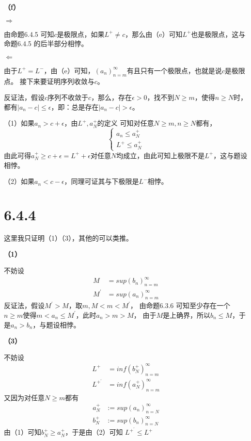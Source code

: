\documentclass{article}
\theoremstyle{mystyle}
\begin{document}
\textbf{（f）}

\textbf{$\Rightarrow$}

由命题6.4.5 可知$c$是极限点，如果$L^+ \neq c$，那么由（e）可知$L^+$也是极限点，这与命题6.4.5
的后半部分相悖。

\textbf{$\Leftarrow$}

由于$L^+ = L^-$，由（e）可知，$(a_n)_{n=m}^\infty$有且只有一个极限点，也就是说$c$是极限点。
接下来要证明序列收敛与$c$。

反证法，假设$c$序列不收敛于$c$，那么，存在$\epsilon > 0$，找不到$N \geq m$，使得$n \geq N$时，
都有$|a_n -c| \leq \epsilon$，即：总是存在$|a_n -c| > \epsilon$。

（1）如果$a_n > c+\epsilon$，由$L^+,a_N^+$的定义 可知对任意$N \geq m, n \geq N$都有，
\begin{equation}
  \begin{cases*}
    a_n \leq a_N^+ \\
    L^+ \leq a_N^+
  \end{cases*}
\end{equation}
由此可得$a_N^+ \geq c+\epsilon=L^+ + \epsilon$对任意$N$均成立，由此可知上极限不是$L^+$，这与题设相悖。

（2）如果$a_n < c - \epsilon$，同理可证其与下极限是$L^-$相悖。

\section*{6.4.4}

这里我只证明（1）（3），其他的可以类推。

\textbf{（1）}

不妨设
\begin{align*}
  M        & = sup(b_n)_{n=m}^\infty \\
  M^\prime & = sup(a_n)_{n=m}^\infty
\end{align*}
反证法，假设$M^\prime > M$，取$m, M < m < M^\prime$，
由命题6.3.6 可知至少存在一个$n \geq m$使得$m < a_n \leq M^\prime$，此时$a_n > m > M$，
由于$M$是上确界，所以$b_n \leq M$，于是$a_n > b_n$，与题设相悖。

\textbf{（3）}

不妨设
\begin{align*}
  L^+          & = inf(b_N^+)_{n=m}^\infty \\
  L^{+^\prime} & = inf(a_N^+)_{n=m}^\infty
\end{align*}
又因为对任意$N \geq m$都有
\begin{align*}
  a_N^+ & := sup(a_n)_{n=N}^\infty \\
  b_N^+ & := sup(b_n)_{n=N}^\infty
\end{align*}
由（1）可知$b_N^+ \geq a_N^+$，于是由（2）可知 $L^{+^\prime} \leq L^+$
\end{document}
